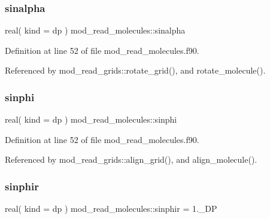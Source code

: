 \mbox{\label{namespacemod__read__molecules_ac481718cc895478caac0b9b181436fc3}} 
\subsubsection{\texorpdfstring{sinalpha}{sinalpha}}
{\footnotesize\ttfamily real( kind = dp ) mod\+\_\+read\+\_\+molecules\+::sinalpha}



Definition at line 52 of file mod\+\_\+read\+\_\+molecules.\+f90.



Referenced by mod\+\_\+read\+\_\+grids\+::rotate\+\_\+grid(), and rotate\+\_\+molecule().

\mbox{\label{namespacemod__read__molecules_aae35f31c005f89820a9d8806eb04c7c6}} 
\subsubsection{\texorpdfstring{sinphi}{sinphi}}
{\footnotesize\ttfamily real( kind = dp ) mod\+\_\+read\+\_\+molecules\+::sinphi}



Definition at line 52 of file mod\+\_\+read\+\_\+molecules.\+f90.



Referenced by mod\+\_\+read\+\_\+grids\+::align\+\_\+grid(), and align\+\_\+molecule().

\mbox{\label{namespacemod__read__molecules_ab49181669d915cd61bc91b536f9013ed}} 
\subsubsection{\texorpdfstring{sinphir}{sinphir}}
{\footnotesize\ttfamily real( kind = dp ) mod\+\_\+read\+\_\+molecules\+::sinphir = 1.\+\_\+\+DP}



